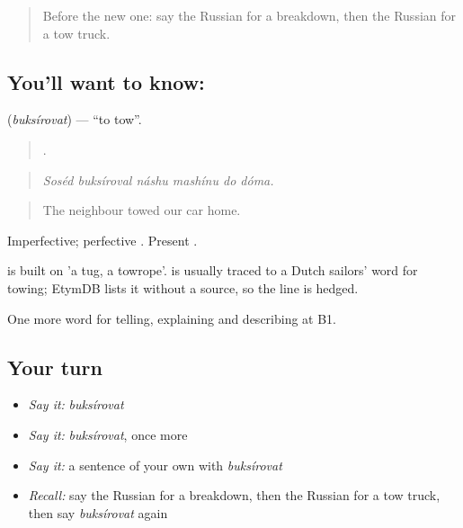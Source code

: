 \label{lesson:RU-C409-buksirovat}



\begin{quote}
Before the new one: say the Russian for a breakdown, then the Russian for a tow truck.
\end{quote}

\subsection*{You'll want to know: }
\textbf{} (\emph{buksírovat}) — \textquotedblleft{}to tow\textquotedblright{}.

\begin{quote}
     .
\end{quote}

\begin{quote}
\emph{Soséd buksíroval náshu mashínu do dóma.}
\end{quote}

\begin{quote}
The neighbour towed our car home.
\end{quote}

Imperfective; perfective \emph{}. Present \emph{}.

\begin{cousinweb}
\emph{} is built on \emph{} 'a tug, a towrope'. \emph{} is usually traced to a Dutch sailors' word for towing; EtymDB lists it without a source, so the line is hedged.
\end{cousinweb}

\begin{grammarlens}[title={What you've built}]
One more word for telling, explaining and describing at B1.
\end{grammarlens}

\subsection*{Your turn}
\begin{itemize}
\raggedright
  \item \emph{Say it:} \emph{buksírovat}
  \item \emph{Say it:} \emph{buksírovat}, once more
  \item \emph{Say it:} a sentence of your own with \emph{buksírovat}
  \item \emph{Recall:} say the Russian for a breakdown, then the Russian for a tow truck, then say \emph{buksírovat} again
\end{itemize}

